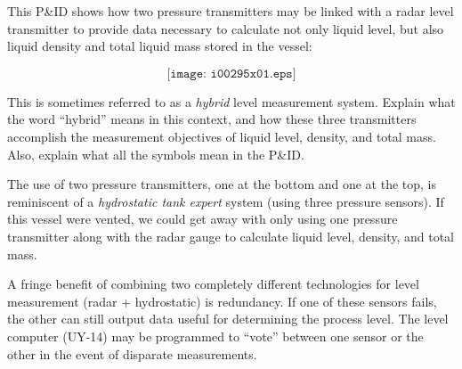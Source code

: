 

This P\&ID shows how two pressure transmitters may be linked with a radar level transmitter to provide data necessary to calculate not only liquid level, but also liquid density and total liquid mass stored in the vessel:

$$\texttt{[image: i00295x01.eps]}$$

This is sometimes referred to as a {\it hybrid} level measurement system.  Explain what the word ``hybrid'' means in this context, and how these three transmitters accomplish the measurement objectives of liquid level, density, and total mass.  Also, explain what all the symbols mean in the P\&ID.

\vskip 10pt







The use of two pressure transmitters, one at the bottom and one at the top, is reminiscent of a {\it hydrostatic tank expert} system (using three pressure sensors).  If this vessel were vented, we could get away with only using one pressure transmitter along with the radar gauge to calculate liquid level, density, and total mass.







A fringe benefit of combining two completely different technologies for level measurement (radar + hydrostatic) is redundancy.  If one of these sensors fails, the other can still output data useful for determining the process level.  The level computer (UY-14) may be programmed to ``vote'' between one sensor or the other in the event of disparate measurements.




